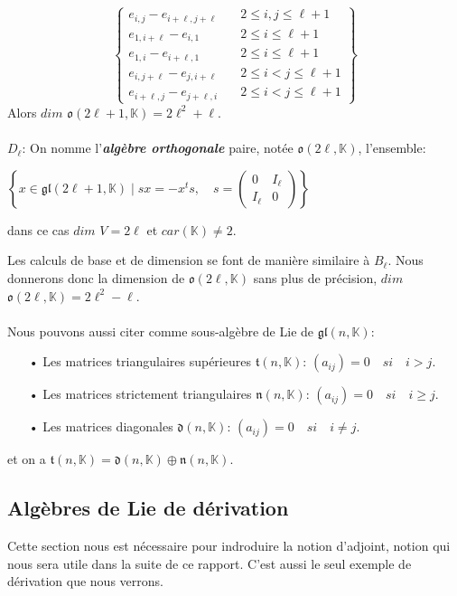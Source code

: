 \documentclass[a4paper,openany,12pt]{report}
\newcommand{\KK}{\mathbb{K}}
\newcommand{\gl}{\mathfrak{gl}}
\newcommand{\ttt}{\mathfrak{t}}
\newcommand{\nn}{\mathfrak{n}}
\newcommand{\dd}{\mathfrak{d}}
\newcommand{\oo}{\mathfrak{o}}
\theoremstyle{break}
{\theorembodyfont{\upshape}
\newtheorem*{rmq}{Remarque :}
\newtheorem*{prv}{Preuve :}
\newtheorem*{ex}{Exemples :}
\newtheorem*{exe}{Exemple : }
\newtheorem*{nota}{Notation :}
\newtheorem*{dem}{D\'emonstration :}}
\begin{document}
\[ \left \{
\begin{aligned}
e_{i,j}-e_{i+\ell,j+\ell } & \quad 2\leq i,j \leq \ell+1\\
e_{1,i+\ell}-e_{i,1} & \quad 2 \leq i \leq \ell+1 \\
e_{1,i}-e_{i+\ell,1} & \quad 2 \leq i \leq \ell+1 \\ 
e_{i,j+\ell}-e_{j,i+\ell} & \quad 2 \leq i < j \leq \ell+1\\
e_{i+\ell,j}-e_{j+\ell,i} & \quad 2 \leq i < j \leq \ell+1
\end{aligned}
\right \} \]
Alors $dim$ $\oo(2\ell+1,\KK)=2\ell^2+\ell$.\\
\\
$ D_{\ell} $:  On nomme l'\textbf{\emph{algèbre orthogonale}} paire, notée  $\oo (2\ell,\KK)$, l'ensemble:
\begin{center}
$ \left \{ x \in \gl(2\ell+1, \KK) \mid sx= -x^ts, \quad s =\begin{pmatrix} 0 & I_\ell \\ I_\ell & 0 \end{pmatrix} \right \}$
\end{center}
dans ce cas $dim$ $V=2 \ell$ et $car(\KK) \ne 2$.

Les calculs de base et de dimension se font de manière similaire à $B_{\ell}$. Nous donnerons donc la dimension de $\oo(2\ell,\KK)$ sans plus de précision, $dim$ $\oo(2\ell,\KK)=2\ell^2-\ell$.\\
\\
\quad Nous pouvons aussi citer comme sous-algèbre de Lie de $\gl(n,\KK)$:
\begin{itemize}
\item[•] Les matrices triangulaires supérieures $\ttt(n,\KK)$: $(a_{ij})= 0  \quad si \quad i>j.$

\item[•] Les matrices strictement  triangulaires  $ \nn(n,\KK)$: $(a_{ij})= 0  \quad si \quad i \geq j.$

\item[•] Les matrices diagonales $\dd(n,\KK)$: $(a_{ij})= 0  \quad si \quad i \ne j .$
\end{itemize}
et on a $\ttt(n,\KK)=\dd(n,\KK) \oplus \nn(n,\KK)$.

\subsection{Algèbres de Lie de  dérivation}

\quad Cette section nous est nécessaire pour indroduire la notion d'adjoint, notion qui nous sera utile dans la suite de ce rapport. C'est aussi le seul exemple de dérivation que nous verrons.
\end{document}
